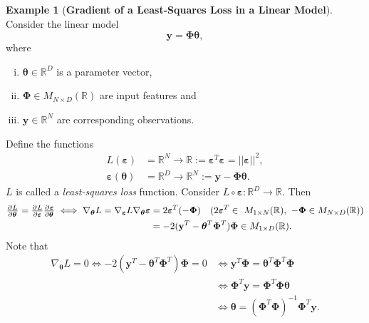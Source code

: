 \documentclass[12pt,openany]{book}
\theoremstyle{definition}
\newtheorem{example}{Example}[chapter]
\newcommand{\R}{\mathbb{R}}
\newcommand{\of}[1]{\left( #1 \right)}
\newcommand{\by}{\times}
\newcommand{\norms}[1]{|| #1||}
\newcommand{\grad}{\nabla}
\newcommand{\mvec}[1]{\boldsymbol{#1}}
\renewcommand{\vec}[1]{\textbf{#1}}
\begin{document}
\begin{example}[\bf Gradient of a Least-Squares Loss in a Linear Model]
	Consider the linear model \[
	\vec{y}=\mvec{\Phi}\mvec{\theta},
	\] where \begin{enumerate}[(i)]
		\item $\mvec{\theta}\in\R^D$ is a parameter vector,
		\item $\mvec{\Phi}\in M_{N\by D}(\R)$ are input features and
		\item $\vec{y}\in\R^N$ are corresponding observations.
	\end{enumerate} Define the functions \begin{align*}
		L(\mvec{\varepsilon})&=\R^N\to\R:=\mvec{\varepsilon}^T\mvec{\varepsilon}=\norms{\mvec{\varepsilon}}^2,\\
		\mvec{\varepsilon}(\mvec{\theta})&=\R^D\to\R^N:=\vec{y}-\mvec{\Phi}\mvec{\theta}.
	\end{align*} $L$ is called a \textit{least-squares loss} function. Consider $L\circ\mvec{\varepsilon}:\R^D\to\R$. Then \begin{align*}
	\pd{L}{\mvec{\theta}}=\pd{L}{\mvec{\varepsilon}}\pd{\mvec{\varepsilon}}{\mvec{\theta}}\iff\grad_{\mvec{\theta}}L=\grad_{\mvec{\varepsilon}}L\grad_{\mvec{\theta}}\mvec{\varepsilon}&=2\mvec{\varepsilon}^T(-\mvec{\Phi})\quad (2\mvec{\varepsilon}^T\in\ M_{1\by N}(\R),\ -\mvec{\Phi}\in M_{N\by D}(\R))\\
	&=-2(\vec{y}^T-\mvec{\theta}^T\mvec{\Phi}^T)\mvec{\Phi}\in M_{1\by D}(\R).
\end{align*} Note that \begin{align*}
\grad_{\mvec{\theta}}L=0\iff-2(\vec{y}^T-\mvec{\theta}^T\mvec{\Phi}^T)\mvec{\Phi}=0&\iff\vec{y}^T\mvec{\Phi}=\mvec{\theta}^T\mvec{\Phi}^T\mvec{\Phi}\\
&\iff\mvec{\Phi}^T\vec{y}=\mvec{\Phi}^T\mvec{\Phi}\mvec{\theta}\\
&\iff\mvec{\theta}=\of{\mvec{\Phi}^T\mvec{\Phi}}^{-1}\mvec{\Phi}^T\vec{y}.
\end{align*}
\begin{figure}[h!]\centering
{}
\end{figure}
\end{example}
\end{document}
